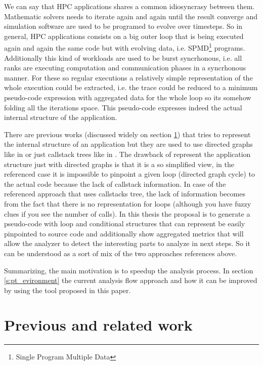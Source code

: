 \documentclass[10pt]{report}
\begin{document}
We can say that HPC applications shares a common idiosyncrasy between them. 
Mathematic solvers needs to iterate again and again until the result converge and 
simulation software are used to be programed to evolve over timesteps. So in 
general, HPC applications consists on a big outer loop that is being executed 
again and again the same code but with evolving data, i.e. SPMD\footnote{Single
Program Multiple Data} programs. Additionally this kind of workloads are used
to be burst syncrhonous, i.e. all ranks are executing computation and
communication phases in a syncrhonous manner. For these so regular executions a
relatively simple representation of the whole execution could be extracted, i.e.
the trace could be reduced to a minimum pseudo-code expression
with aggregated data for the whole loop so its somehow folding all the iterations
space. This pseudo-code expresses indeed the actual internal structure of the 
application.

There are previous works (discussed widely on section \ref{related_work})  that 
tries to represent the internal structure of an application but they are used to
use directed graphs like in \cite{aguilar2016event} or just callstack trees like
in \cite{saviankou2015cube}. The drawback of represent the application structure
just with directed graphs is that it is a so simplified view, in the referenced
case it is impossible to pinpoint a given loop (directed graph cycle) to the
actual code because the lack of callstack information. In case of the
referenced approach that uses callstacks tree, the lack of information becomes
from the fact that there is no representation for loops (although you have fuzzy
clues if you see the number of calls). In this thesis the proposal is to 
generate a pseudo-code with loop and conditional structures that can represent
be easily pinpointed to source code and additionally show aggregated metrics
that will allow the analyzer to detect the interesting parts to analyze in next
steps. So it can be understood as a sort of mix of the two approaches references
above.

Summarizing, the main motivation is to speedup the analysis process. In section
\ref{s:pt_evironment} the current analysis flow approach and how it can be
improved by using the tool proposed in this paper.

\section{Previous and related work}\label{related_work}
\end{document}
